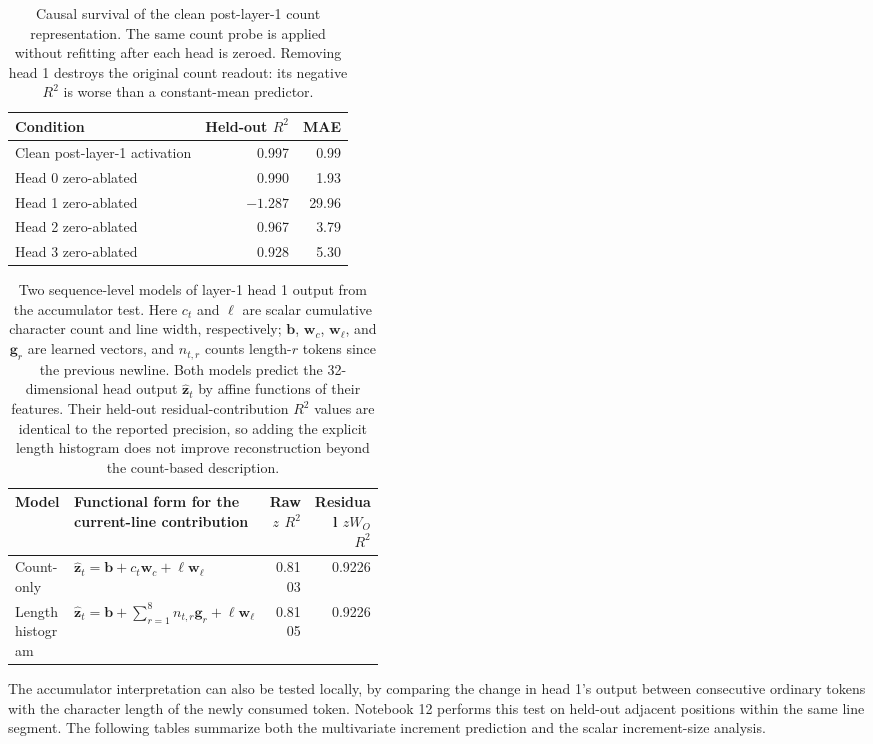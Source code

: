 \documentclass[11pt]{article}
\begin{document}
\begin{table}[t]
\centering
\small
\begin{tabular}{lrr}
\toprule
Condition & Held-out $R^2$ & MAE \\
\midrule
Clean post-layer-1 activation & 0.997 & 0.99 \\
Head 0 zero-ablated & 0.990 & 1.93 \\
Head 1 zero-ablated & $-1.287$ & 29.96 \\
Head 2 zero-ablated & 0.967 & 3.79 \\
Head 3 zero-ablated & 0.928 & 5.30 \\
\bottomrule
\end{tabular}
\caption{Causal survival of the clean post-layer-1 count representation.
The same count probe is applied without refitting after each head is zeroed.
Removing head 1 destroys the original count readout: its negative $R^2$ is
worse than a constant-mean predictor.}
\label{tab:head1-count-causal-ablation}
\end{table}

\begin{table}[t]
\centering
\small
\begin{tabular}{l p{0.43\linewidth} rr}
\toprule
Model & Functional form for the current-line contribution &
Raw $z$ $R^2$ & Residual $zW_O$ $R^2$ \\
\midrule
Count-only &
$\hat{\mathbf z}_t=\mathbf b+c_t\mathbf w_c+\ell\mathbf w_\ell$
& 0.8103 & 0.9226 \\
Length histogram &
$\hat{\mathbf z}_t=\mathbf b+\sum_{r=1}^{8}n_{t,r}\mathbf g_r+\ell\mathbf w_\ell$
&
0.8105 & 0.9226 \\
\bottomrule
\end{tabular}
\caption{Two sequence-level models of layer-1 head 1 output from the
accumulator test. Here $c_t$ and $\ell$ are scalar cumulative character count
and line width, respectively; $\mathbf b$, $\mathbf w_c$, $\mathbf w_\ell$,
and $\mathbf g_r$ are learned vectors, and $n_{t,r}$ counts length-$r$ tokens
since the previous newline. Both models predict the 32-dimensional head
output $\hat{\mathbf z}_t$ by affine functions of their features. Their
held-out residual-contribution $R^2$ values are identical to the reported
precision, so adding the explicit length histogram does not improve
reconstruction beyond the count-based description.}
\label{tab:head1-accumulator-models}
\end{table}

The accumulator interpretation can also be tested locally, by comparing the
change in head 1's output between consecutive ordinary tokens with the
character length of the newly consumed token.  Notebook 12 performs this
test on held-out adjacent positions within the same line segment.  The
following tables summarize both the multivariate increment prediction and
the scalar increment-size analysis.
\end{document}

